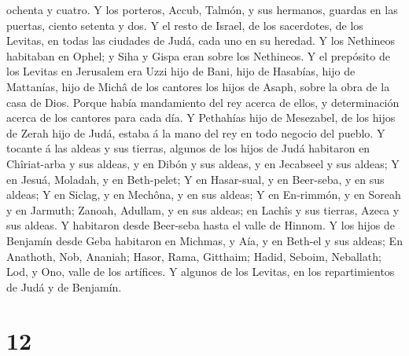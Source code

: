 ochenta y cuatro.  Y los porteros, Accub, Talmón, y sus
hermanos, guardas en las puertas, ciento setenta y dos.  Y
el resto de Israel, de los sacerdotes, de los Levitas, en todas las
ciudades de Judá, cada uno en su heredad.  Y los Nethineos
habitaban en Ophel; y Siha y Gispa eran sobre los Nethineos.
 Y el prepósito de los Levitas en Jerusalem era Uzzi hijo
de Bani, hijo de Hasabías, hijo de Mattanías, hijo de Michâ de los
cantores los hijos de Asaph, sobre la obra de la casa de Dios.
 Porque había mandamiento del rey acerca de ellos, y
determinación acerca de los cantores para cada día.  Y
Pethahías hijo de Mesezabel, de los hijos de Zerah hijo de Judá, estaba
á la mano del rey en todo negocio del pueblo.  Y tocante á
las aldeas y sus tierras, algunos de los hijos de Judá habitaron en
Chîriat-arba y sus aldeas, y en Dibón y sus aldeas, y en Jecabseel y sus
aldeas;  Y en Jesuá, Moladah, y en Beth-pelet;
 Y en Hasar-sual, y en Beer-seba, y en sus aldeas;
 Y en Siclag, y en Mechôna, y en sus aldeas; 
Y en En-rimmón, y en Soreah y en Jarmuth;  Zanoah, Adullam,
y en sus aldeas; en Lachîs y sus tierras, Azeca y sus aldeas. Y
habitaron desde Beer-seba hasta el valle de Hinnom.  Y los
hijos de Benjamín desde Geba habitaron en Michmas, y Aía, y en Beth-el y
sus aldeas;  En Anathoth, Nob, Ananiah; 
Hasor, Rama, Gitthaim;  Hadid, Seboim, Neballath;
 Lod, y Ono, valle de los artífices.  Y
algunos de los Levitas, en los repartimientos de Judá y de Benjamín.

\hypertarget{section-11}{%
\section{12}\label{section-11}}

